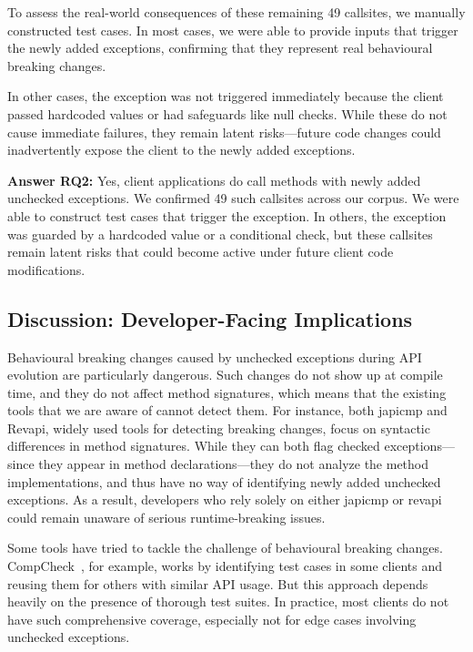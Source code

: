 To assess the real-world consequences of these remaining 49 callsites, we manually constructed test cases. In most cases, we were able to provide inputs that trigger the newly added exceptions, confirming that they represent real behavioural breaking changes.

In other cases, the exception was not triggered immediately because the client passed hardcoded values or had safeguards like null checks. While these do not cause immediate failures, they remain latent risks—future code changes could inadvertently expose the client to the newly added exceptions.

\vspace{1em}
\begin{tcolorbox}[colback=gray!10, colframe=black]
\textbf{Answer RQ2:} Yes, client applications do call methods with newly added unchecked exceptions. We confirmed 49 such callsites across our corpus. We were able to construct test cases that trigger the exception. In others, the exception was guarded by a hardcoded value or a conditional check, but these callsites remain latent risks that could become active under future client code modifications.
\end{tcolorbox}
\vspace{1em}

\subsection{Discussion: Developer-Facing Implications}

Behavioural breaking changes caused by unchecked exceptions during API evolution are particularly dangerous. Such changes do not show up at compile time, and they do not affect method signatures, which means that the existing tools that we are aware of cannot detect them. For instance, both japicmp and Revapi, widely used tools for detecting breaking changes, focus on syntactic differences in method signatures. While they can both flag checked exceptions—since they appear in method declarations—they do not analyze the method implementations, and thus have no way of identifying newly added unchecked exceptions. As a result, developers who rely solely on either japicmp or revapi could remain unaware of serious runtime-breaking issues.

Some tools have tried to tackle the challenge of behavioural breaking changes. CompCheck~\cite{CompCheck}, for example, works by identifying test cases in some clients and reusing them for others with similar API usage. But this approach depends heavily on the presence of thorough test suites. In practice, most clients do not have such comprehensive coverage, especially not for edge cases involving unchecked exceptions.

